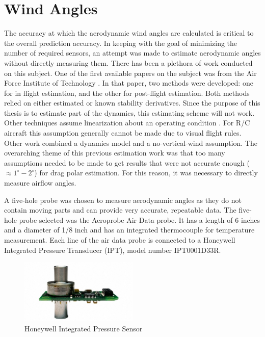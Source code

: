 \documentclass[12pt]{ucthesis}
\begin{document}
\section{Wind Angles}
The accuracy at which the aerodynamic wind angles are calculated is critical to the overall prediction accuracy. In keeping with the goal of minimizing the number of required sensors, an attempt was made to estimate aerodynamic angles without directly measuring them. There has been a plethora of work conducted on this subject. One of the first available papers on the subject was from the Air Force Institute of Technology \cite{joseph1988}. In that paper, two methods were developed: one for in flight estimation, and the other for post-flight estimation. Both methods relied on either estimated or known stability derivatives. Since the purpose of this thesis is to estimate part of the dynamics, this estimating scheme will not work. Other techniques assume linearization about an operating condition \cite{morelli2012real}. For R/C aircraft this assumption generally cannot be made due to visual flight rules. Other work \cite{Lie2013} combined a dynamics model and a no-vertical-wind assumption. The overarching theme of this previous estimation work was that too many assumptions needed to be made to get results that were not accurate enough ($\approx1^\circ-2^\circ$) for drag polar estimation. For this reason, it was necessary to directly measure airflow angles.

\indent
A five-hole probe was chosen to measure aerodynamic angles as they do not contain moving parts and can provide very accurate, repeatable data. The five-hole probe selected was the Aeroprobe Air Data probe. It has a length of 6 inches and a diameter of 1/8 inch and has an integrated thermocouple for temperature measurement. Each line of the air data probe is connected to a Honeywell Integrated Pressure Transducer (IPT), model number IPT0001D33R. 

\begin{figure}[H]
  \caption{Honeywell Integrated Pressure Sensor} \label{honeywellIPTPicture}
  \centering
    \includegraphics[width=0.5\textwidth]{figures/honeywellIPT.jpg}
\end{figure}
\end{document}
